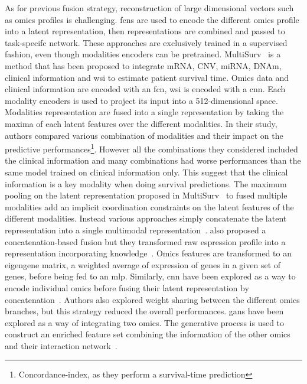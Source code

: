 \documentclass[../main.tex]{subfiles}
\begin{document}
	    As for previous fusion strategy, reconstruction of large dimensional vectors such as omics profiles is challenging.
	    \Glspl{fcn} are used to encode the different omics profile into a latent representation, then representations are combined and passed to task-specifc network.
	    These approaches are exclusively trained in a supervised fashion, even though modalities encoders can be pretrained.
	    MultiSurv~\cite{MultiSurv} is a method that has been proposed to integrate mRNA, CNV, miRNA, DNAm, clinical information and \gls{wsi} to estimate patient survival time.
	    Omics data and clinical information are encoded with an \gls{fcn}, \gls{wsi} is encoded with a \gls{cnn}.
	    Each modality encoders is used to project its input into a 512-dimensional space.
	    Modalities representation are fused into a single representation by taking the maxima of each latent features over the different modalities.
	    In their study, authors compared various combination of modalities and their impact on the predictive performances\footnote{Concordance-index, as they perform a survival-time prediction}.
	    However all the combinations they considered included the clinical information and many combinations had worse performances than the same model trained on clinical information only.
	    This suggest that the clinical information is a key modality when doing survival predictions.
	    The maximum pooling on the latent representation proposed in MultiSurv~\cite{MultiSurv} to fused multiple modalities add an implicit coordination constraints on the latent features of the different modalities.
	    Instead various approaches simply concatenate the latent representation into a single multimodal representation~\cite{MOLI,Lin2020}.
	    \citeauthor{SALMON} also proposed a concatenation-based fusion but they transformed raw espression profile into a representation incorporating knowledge~\cite{SALMON}.
	    Omics features are transformed to an eigengene matrix, a weighted average of expression of genes in a given set of genes, before being fed to an \gls{mlp}.
	    Similarly, \gls{cnn} have been explored as a way to encode individual omics before fusing their latent representation by concatenation~\cite{MohaiminulIslam2020}.
	    Authors also explored weight sharing between the different omics branches, but this strategy reduced the overall performances.
	    \Glspl{gan} have been explored as a way of integrating two omics.
	    The generative process is used to construct an enriched feature set combining the information of the other omics and their interaction network~\cite{omicsGAN}.
\end{document}
